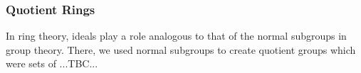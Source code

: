 



\subsubsection{Quotient Rings}
In ring theory, ideals play a role analogous to that of the normal subgroups in group theory. There, we used normal subgroups to create quotient groups which were sets of ...TBC...









